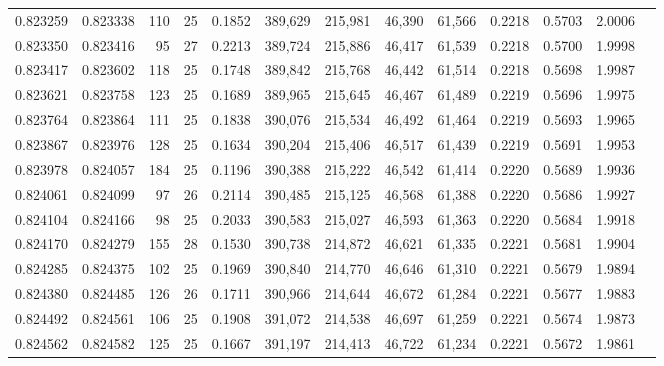\begin{tabular}{rrrrrrrrrrrrr}
0.823259 & 0.823338 &   110 &  25 &                                     0.1852 & 389,629 & 215,981 &  46,390 &  61,566 & 0.2218 & 0.5703 & 2.0006 \\
0.823350 & 0.823416 &    95 &  27 &                                     0.2213 & 389,724 & 215,886 &  46,417 &  61,539 & 0.2218 & 0.5700 & 1.9998 \\
0.823417 & 0.823602 &   118 &  25 &                                     0.1748 & 389,842 & 215,768 &  46,442 &  61,514 & 0.2218 & 0.5698 & 1.9987 \\
0.823621 & 0.823758 &   123 &  25 &                                     0.1689 & 389,965 & 215,645 &  46,467 &  61,489 & 0.2219 & 0.5696 & 1.9975 \\
0.823764 & 0.823864 &   111 &  25 &                                     0.1838 & 390,076 & 215,534 &  46,492 &  61,464 & 0.2219 & 0.5693 & 1.9965 \\
0.823867 & 0.823976 &   128 &  25 &                                     0.1634 & 390,204 & 215,406 &  46,517 &  61,439 & 0.2219 & 0.5691 & 1.9953 \\
0.823978 & 0.824057 &   184 &  25 &                                     0.1196 & 390,388 & 215,222 &  46,542 &  61,414 & 0.2220 & 0.5689 & 1.9936 \\
0.824061 & 0.824099 &    97 &  26 &                                     0.2114 & 390,485 & 215,125 &  46,568 &  61,388 & 0.2220 & 0.5686 & 1.9927 \\
0.824104 & 0.824166 &    98 &  25 &                                     0.2033 & 390,583 & 215,027 &  46,593 &  61,363 & 0.2220 & 0.5684 & 1.9918 \\
0.824170 & 0.824279 &   155 &  28 &                                     0.1530 & 390,738 & 214,872 &  46,621 &  61,335 & 0.2221 & 0.5681 & 1.9904 \\
0.824285 & 0.824375 &   102 &  25 &                                     0.1969 & 390,840 & 214,770 &  46,646 &  61,310 & 0.2221 & 0.5679 & 1.9894 \\
0.824380 & 0.824485 &   126 &  26 &                                     0.1711 & 390,966 & 214,644 &  46,672 &  61,284 & 0.2221 & 0.5677 & 1.9883 \\
0.824492 & 0.824561 &   106 &  25 &                                     0.1908 & 391,072 & 214,538 &  46,697 &  61,259 & 0.2221 & 0.5674 & 1.9873 \\
0.824562 & 0.824582 &   125 &  25 &                                     0.1667 & 391,197 & 214,413 &  46,722 &  61,234 & 0.2221 & 0.5672 & 1.9861 \\

\end{tabular}
